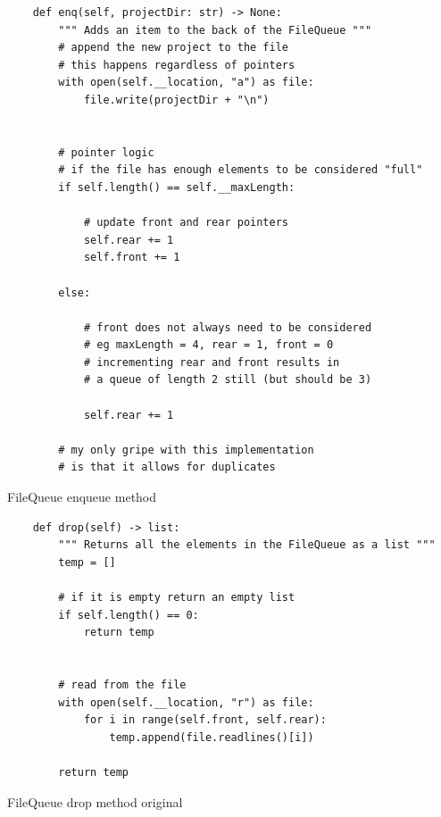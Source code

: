 \documentclass[11pt]{article}
\begin{document}
        \newpage
        \begin{listing}[!h]
            \begin{verbatim}
    def enq(self, projectDir: str) -> None:
        """ Adds an item to the back of the FileQueue """
        # append the new project to the file
        # this happens regardless of pointers
        with open(self.__location, "a") as file:
            file.write(projectDir + "\n")
        
        
        # pointer logic
        # if the file has enough elements to be considered "full"
        if self.length() == self.__maxLength:
                
            # update front and rear pointers
            self.rear += 1
            self.front += 1
        
        else:
            
            # front does not always need to be considered  
            # eg maxLength = 4, rear = 1, front = 0
            # incrementing rear and front results in 
            # a queue of length 2 still (but should be 3)
            
            self.rear += 1
            
        # my only gripe with this implementation 
        # is that it allows for duplicates
            \end{verbatim}
            \caption{FileQueue enqueue method}
            \label{sc:fileq-enq-method}
        \end{listing}

        \newpage
        \begin{listing}[!h]
            \begin{verbatim}
    def drop(self) -> list:
        """ Returns all the elements in the FileQueue as a list """
        temp = []
        
        # if it is empty return an empty list
        if self.length() == 0:
            return temp
        
        
        # read from the file
        with open(self.__location, "r") as file:
            for i in range(self.front, self.rear):
                temp.append(file.readlines()[i])
                
        return temp
            \end{verbatim}
            \caption{FileQueue drop method original}
            \label{sc:fileq-drop-method-og}
        \end{listing}
\end{document}
